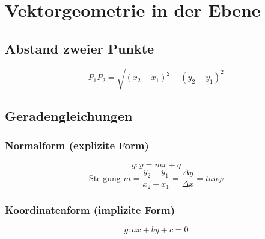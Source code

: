 



















\section{Vektorgeometrie in der Ebene}

\subsection{Abstand zweier Punkte}
\[ \boxed{ \overline{P_1 P_2} = \sqrt{ (x_2 - x_1)^2 + (y_2 - y_1)^2 } } \]

\subsection{Geradengleichungen}

\subsubsection{Normalform (explizite Form)}
\[ \boxed{ g: y= mx + q }\]
\[ \boxed{ \text{Steigung } m = \frac{y_2 - y_1}{x_2 - x_1} = \frac{\Delta y}{\Delta x}  = tan \varphi } \]

\subsubsection{Koordinatenform (implizite Form)}
\[ \boxed{ g: ax + by + c = 0 } \]

